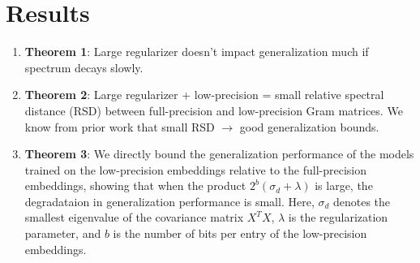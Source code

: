 \documentclass[12pt]{article}
\begin{document}
\section{Results}
\begin{enumerate}
	\item \textbf{Theorem 1}: Large regularizer doesn't impact generalization much if spectrum decays slowly.
	\item \textbf{Theorem 2}: Large regularizer + low-precision = small relative spectral distance (RSD) between full-precision and low-precision Gram matrices.  We know from prior work that small RSD $\rightarrow$ good generalization bounds.
	\item \textbf{Theorem 3}: We directly bound the generalization performance of the models trained on the low-precision embeddings relative to the full-precision embeddings, showing that when the product $2^b(\sigma_d  + \lambda)$ is large, the degradataion in generalization performance is small.  Here, $\sigma_d$ denotes the smallest eigenvalue of the covariance matrix $X^T X$, $\lambda$ is the regularization parameter, and $b$ is the number of bits per entry of the low-precision embeddings.
\end{enumerate}
\end{document}
